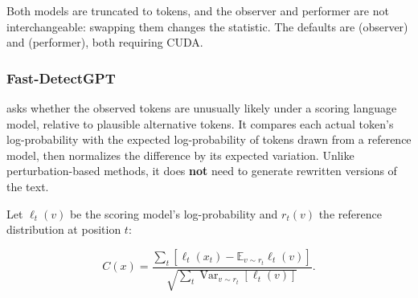 Both models are truncated to \texttt{} tokens, and the
observer and performer are not interchangeable: swapping them changes
the statistic. The defaults are \texttt{}
(observer) and \texttt{}
(performer), both requiring CUDA.

\subsubsection{Fast-DetectGPT}\label{record-DETECTORS-md-fast-detectgpt}

\texttt{} asks whether the observed
tokens are unusually likely under a scoring language model, relative to
plausible alternative tokens. It compares each actual token's
log-probability with the expected log-probability of tokens drawn from a
reference model, then normalizes the difference by its expected
variation. Unlike perturbation-based methods, it does \textbf{not} need
to generate rewritten versions of the text.

Let \(\ell_t(v)\) be the scoring model's log-probability and \(r_t(v)\)
the reference distribution at position \(t\):

\[
C(x)=\frac{\sum_t[\ell_t(x_t)-\mathbb E_{v\sim r_t}\ell_t(v)]}
{\sqrt{\sum_t\operatorname{Var}_{v\sim r_t}[\ell_t(v)]}}.
\]

